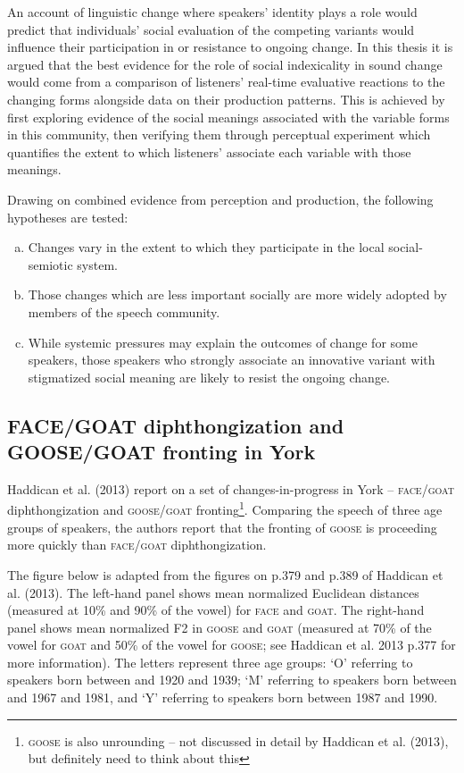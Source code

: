 \documentclass{article}
\begin{document}
An account of linguistic change where speakers' identity plays a role would predict that individuals' social evaluation of the competing variants would influence their participation in or resistance to ongoing change. In this thesis it is argued that the best evidence for the role of social indexicality in sound change would come from a comparison of listeners' real-time evaluative reactions to the changing forms alongside data on their production patterns. This is achieved by first exploring evidence of the social meanings associated with the variable forms in this community, then verifying them through perceptual experiment which quantifies the extent to which listeners' associate each variable with those meanings. 

Drawing on combined evidence from perception and production, the following hypotheses are tested:
\begin{enumerate}[(a)]
\item{Changes vary in the extent to which they participate in the local social-semiotic system.}
\item{Those changes which are less important socially are more widely adopted by members of the speech community.}
\item{While systemic pressures may explain the outcomes of change for some speakers, those speakers who strongly associate an innovative variant with stigmatized social meaning are likely to resist the ongoing change.}
\end{enumerate}
\newpage
\subsection*{\textsc{FACE/GOAT} diphthongization and \textsc{GOOSE/GOAT} fronting in York}
Haddican et al. (2013) report on a set of changes-in-progress in York -- \textsc{face}/\textsc{goat} diphthongization and \textsc{goose}/\textsc{goat} fronting\footnote{\textsc{goose} is also unrounding -- not discussed in detail by Haddican et al. (2013), but definitely need to think about this}. Comparing the speech of three age groups of speakers, the authors report that the fronting of \textsc{goose} is proceeding more quickly than \textsc{face}/\textsc{goat} diphthongization. 

The figure below is adapted from the figures on p.379 and p.389 of Haddican et al. (2013). The left-hand panel shows mean normalized Euclidean distances (measured at 10\% and 90\% of the vowel) for \textsc{face} and \textsc{goat}. The right-hand panel shows mean normalized F2 in \textsc{goose} and \textsc{goat} (measured at 70\% of the vowel for \textsc{goat} and 50\% of the vowel for \textsc{goose}; see Haddican et al. 2013 p.377 for more information). The letters represent three age groups: `O' referring to speakers born between and 1920 and 1939; `M' referring to speakers born between and 1967 and 1981, and `Y' referring to speakers born between 1987 and 1990. 
\end{document}
